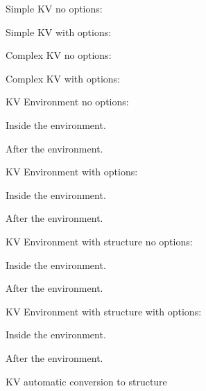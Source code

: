 \documentclass{article}
\begin{document}
Simple KV no options: \KVsimple

Simple KV with options: \KVsimple[width=100, height=200]

Complex KV no options: \KVcomplex

Complex KV with options: \KVcomplex[width=100, height=200]

KV Environment no options:
\begin{KVenv}
Inside the environment.
\end{KVenv}
After the environment.

KV Environment with options:
\begin{KVenv}[width=100, height=200]
Inside the environment.
\end{KVenv}
After the environment.


KV Environment with structure no options:
\begin{KVstruct}
Inside the environment.
\end{KVstruct}
After the environment.

KV Environment with structure with options:
\begin{KVstruct}[width=100, height=200]
Inside the environment.
\end{KVstruct}
After the environment.

KV automatic conversion to structure
\end{document}
